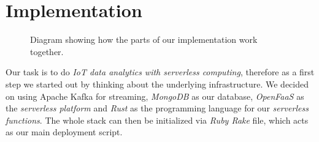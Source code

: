 \section{Implementation}

\begin{figure}[H]
  \caption{
    Diagram showing how the parts of our implementation work together.
    \cite{smartphone-icon, browser-icon}
  }
\end{figure}

Our task is to do \textit{IoT data analytics with serverless computing}, therefore as a first step
we started out by thinking about the underlying infrastructure. We decided on using Apache Kafka for
streaming, \textit{MongoDB} as our database, \textit{OpenFaaS} as the \textit{serverless platform} and
\textit{Rust} as the programming language for our \textit{serverless functions}. The whole stack can then be
initialized via \textit{Ruby Rake} file, which acts as our main deployment script.







